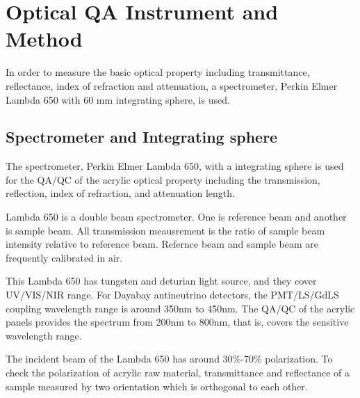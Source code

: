 
\section {Optical QA Instrument and Method}

In order to measure the basic optical property including
transmittance, reflectance, index of refraction and attenuation,
a spectrometer, Perkin Elmer Lambda 650 with 60 mm integrating sphere,
is used.


\subsection {Spectrometer and Integrating sphere}

The spectrometer, Perkin Elmer Lambda 650, with a integrating sphere is used for the QA/QC
of the acrylic optical property including
the transmission, reflection, index of refraction, and attenuation length.

Lambda 650 is a double beam spectrometer. One is reference beam and another is
sample beam. All transmission meausrement is the ratio of sample beam intensity relative to
reference beam. Refernce beam and sample beam are frequently calibrated in air.

This Lambda 650 has tungsten and deturian light source, and they cover UV/VIS/NIR
range. For Dayabay antineutrino detectors, the PMT/LS/GdLS coupling wavelength range
is around 350nm to 450nm. The QA/QC of the acrylic panels provides the spectrum
from 200nm to 800nm, that is, covers the sensitive wavelength range.

The incident beam of the Lambda 650 has around 30\%-70\% polarization.
To check the polarization of acrylic raw material, transmittance and reflectance of a sample
measured by two orientation which is orthogonal to each other.



